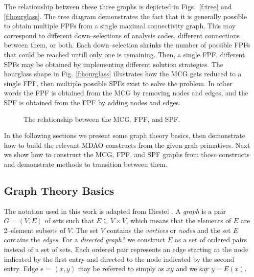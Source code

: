 The relationship between these three graphs is depicted in Figs.~\ref{f:tree} and \ref{f:hourglass}. 
The tree diagram demonstrates the fact that it is generally possible to obtain 
multiple FPFs from a single maximal connectivity graph. This  may correspond to 
different down--selections of analysis codes, different connections between them, 
or both. Each down--selection shrinks the number of possible FPFs that could be reached 
untill only one is remaining. Then, a single FPF, different SPFs may be obtained by implementing 
different solution strategies. The hourglass shape in Fig. \ref{f:hourglass} illustrates how 
the MCG gets reduced to a single FPF, then multiple possible SPFs exist to solve the problem.
In other words the FPF is obtained from the MCG by removing nodes and edges, 
and the SPF is obtained from the FPF by adding nodes and edges.

\begin{figure}[htb!]
    \centering
\caption{The relationship between the MCG, FPF, and SPF.}
\end{figure}

In the following sections we present some graph theory basics, then demonstrate how to build 
the relevant MDAO constructs from the given grah primatives. Next we show how to construct 
the MCG, FPF, and SPF graphs from those constructs and demonstrate methods to transition between 
them. 

\subsection{Graph Theory Basics}
The notation used in this work is adapted from Diestel \cite{Diestel2010}. 
A \emph{graph} is a pair $G = (V,E)$ of sets such that $E \subseteq V \times V$, 
which means that the elements of $E$ are 2--element subsets of $V$. The set $V$ 
contains the \emph{vertices} or \emph{nodes} and the set $E$ contains the \emph{edges}.
For a \emph{directed graph*} we construct $E$ as a set of ordered pairs instead 
of a set of sets. Each ordered pair represents an edge starting at the node 
indicated by the first entry and directed to the node indicated by the second 
entry. Edge $e$ = $(x,y)$ may be referred to simply as $xy$ and we say $y = E(x)$. 


